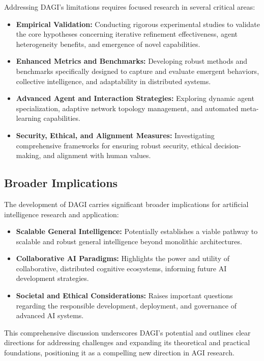 \documentclass[12pt]{amsart}
\begin{document}
Addressing DAGI's limitations requires focused research in several critical areas:

\begin{itemize}
    \item \textbf{Empirical Validation:} Conducting rigorous experimental studies to validate the core hypotheses concerning iterative refinement effectiveness, agent heterogeneity benefits, and emergence of novel capabilities.
    \item \textbf{Enhanced Metrics and Benchmarks:} Developing robust methods and benchmarks specifically designed to capture and evaluate emergent behaviors, collective intelligence, and adaptability in distributed systems.
    \item \textbf{Advanced Agent and Interaction Strategies:} Exploring dynamic agent specialization, adaptive network topology management, and automated meta-learning capabilities.
    \item \textbf{Security, Ethical, and Alignment Measures:} Investigating comprehensive frameworks for ensuring robust security, ethical decision-making, and alignment with human values.
\end{itemize}

\subsection{Broader Implications}

The development of DAGI carries significant broader implications for artificial intelligence research and application:

\begin{itemize}
    \item \textbf{Scalable General Intelligence:} Potentially establishes a viable pathway to scalable and robust general intelligence beyond monolithic architectures.
    \item \textbf{Collaborative AI Paradigms:} Highlights the power and utility of collaborative, distributed cognitive ecosystems, informing future AI development strategies.
    \item \textbf{Societal and Ethical Considerations:} Raises important questions regarding the responsible development, deployment, and governance of advanced AI systems.
\end{itemize}

This comprehensive discussion underscores DAGI’s potential and outlines clear directions for addressing challenges and expanding its theoretical and practical foundations, positioning it as a compelling new direction in AGI research.
\end{document}

